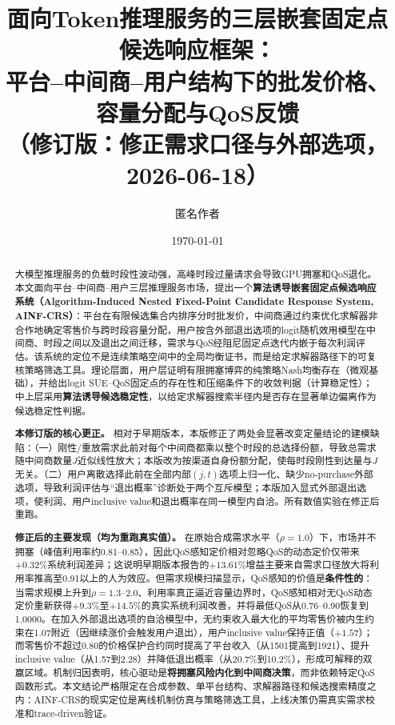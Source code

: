 \documentclass[UTF8,11pt]{ctexart}
\title{\textbf{面向Token推理服务的三层嵌套固定点候选响应框架：\\
平台--中间商--用户结构下的批发价格、容量分配与QoS反馈\\
\large（修订版：修正需求口径与外部选项，2026-06-18）}}
\author{匿名作者}
\date{\today}
\begin{document}
\maketitle

\begin{abstract}
大模型推理服务的负载时段性波动强，高峰时段过量请求会导致GPU拥塞和QoS退化。本文面向平台--中间商--用户三层推理服务市场，提出一个\textbf{算法诱导嵌套固定点候选响应系统（Algorithm-Induced Nested Fixed-Point Candidate Response System, AINF-CRS）}：平台在有限候选集合内排序分时批发价，中间商通过约束优化求解器非合作地确定零售价与跨时段容量分配，用户按含外部退出选项的logit随机效用模型在中间商、时段之间以及退出之间迁移，需求与QoS经阻尼固定点迭代内嵌于每次利润评估。该系统的定位不是连续策略空间中的全局均衡证书，而是给定求解器路径下的可复核策略筛选工具。理论层面，用户层证明有限拥塞博弈的纯策略Nash均衡存在（微观基础），并给出logit SUE--QoS固定点的存在性和压缩条件下的收敛判据（计算稳定性）；中上层采用\textbf{算法诱导候选稳定性}，以给定求解器搜索半径内是否存在显著单边偏离作为候选稳定性判据。

\textbf{本修订版的核心更正。} 相对于早期版本，本版修正了两处会显著改变定量结论的建模缺陷：（一）刚性/重放需求此前对每个中间商都乘以整个时段的总选择份额，导致总需求随中间商数量$J$近似线性放大；本版改为按渠道自身份额分配，使每时段刚性到达量与$J$无关。（二）用户离散选择此前在全部内部$(j,t)$选项上归一化、缺少no-purchase外部选项，导致利润评估与“退出概率”诊断处于两个互斥模型；本版加入显式外部退出选项，使利润、用户inclusive value和退出概率在同一模型内自洽。所有数值实验在修正后重跑。

\textbf{修正后的主要发现（均为重跑真实值）。} 在原始合成需求水平（$\rho=1.0$）下，市场并不拥塞（峰值利用率约0.81--0.85），因此QoS感知定价相对忽略QoS的动态定价仅带来$+0.32\%$系统利润差异；这说明早期版本报告的$+13.61\%$增益主要来自需求口径放大将利用率推高至0.91以上的人为效应。但需求规模扫描显示，QoS感知的价值是\textbf{条件性的}：当需求规模上升到$\rho=1.3$--$2.0$、利用率真正逼近容量边界时，QoS感知相对无QoS动态定价重新获得$+9.3\%$至$+14.5\%$的真实系统利润改善，并将最低QoS从0.76--0.90恢复到1.0000。在加入外部退出选项的自洽模型中，无约束收入最大化的平均零售价被内生约束在1.07附近（因继续涨价会触发用户退出），用户inclusive value保持正值（$+1.57$）；而零售价不超过0.80的价格保护合约同时提高了平台收入（从1501提高到1921）、提升inclusive value（从1.57到2.28）并降低退出概率（从20.7\%到10.2\%），形成可解释的双赢区域。机制归因表明，核心驱动是\textbf{将拥塞风险内化到中间商决策}，而非依赖特定QoS函数形式。本文结论严格限定在合成参数、单平台结构、求解器路径和候选搜索精度之内：AINF-CRS的现实定位是离线机制仿真与策略筛选工具，上线决策仍需真实需求校准和trace-driven验证。
\end{abstract}
\end{document}

